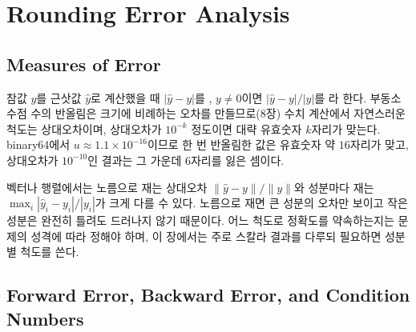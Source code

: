 \chapter{Rounding Error Analysis}
\label{ch:rounding-error}


\section{Measures of Error}
\label{sec:error-measures}

참값 $y$를 근삿값 $\hat y$로 계산했을 때 $|\hat y-y|$를 , $y\ne0$이면 $|\hat y-y|/|y|$를 라 한다. 부동소수점 수의 반올림은 크기에 비례하는 오차를 만들므로(8장) 수치 계산에서 자연스러운 척도는 상대오차이며, 상대오차가 $10^{-k}$ 정도이면 대략 유효숫자 $k$자리가 맞는다. binary64에서 $u\approx1.1\times10^{-16}$이므로 한 번 반올림한 값은 유효숫자 약 $16$자리가 맞고, 상대오차가 $10^{-10}$인 결과는 그 가운데 $6$자리를 잃은 셈이다.

벡터나 행렬에서는 노름으로 재는 상대오차 $\|\hat y-y\|/\|y\|$와 성분마다 재는 $\max_i|\hat y_i-y_i|/|y_i|$가 크게 다를 수 있다. 노름으로 재면 큰 성분의 오차만 보이고 작은 성분은 완전히 틀려도 드러나지 않기 때문이다. 어느 척도로 정확도를 약속하는지는 문제의 성격에 따라 정해야 하며, 이 장에서는 주로 스칼라 결과를 다루되 필요하면 성분별 척도를 쓴다.

\section{Forward Error, Backward Error, and Condition Numbers}
\label{sec:forward-backward}

